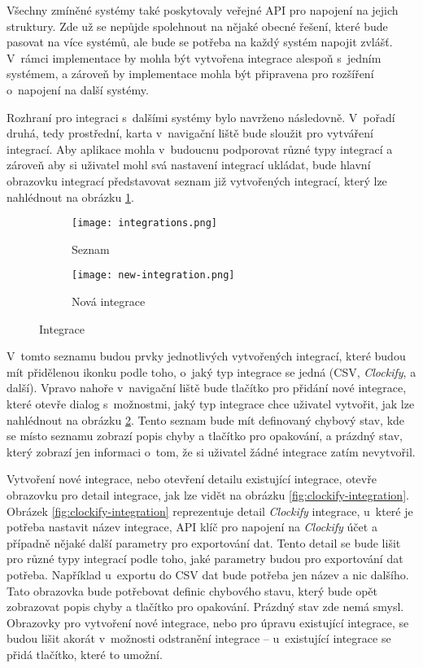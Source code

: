 Všechny zmíněné systémy také poskytovaly veřejné API pro napojení na jejich struktury. Zde už se nepůjde spolehnout na nějaké obecné řešení, které bude pasovat na více systémů, ale bude se potřeba na každý systém napojit zvlášť. V~rámci implementace by mohla být vytvořena integrace alespoň s~jedním systémem, a zároveň by implementace mohla být připravena pro rozšíření o~napojení na další systémy.

Rozhraní pro integraci s~dalšími systémy bylo navrženo následovně. V~pořadí druhá, tedy prostřední, karta v~navigační liště bude sloužit pro vytváření integrací. Aby aplikace mohla v~budoucnu podporovat různé typy integrací a zároveň aby si uživatel mohl svá nastavení integrací ukládat, bude hlavní obrazovku integrací představovat seznam již vytvořených integrací, který lze nahlédnout na obrázku \ref{fig:integration-list}.

\begin{figure}[h]
    \centering
    \begin{subfigure}[b]{0.4\textwidth}
		\centering
		\texttt{[image: integrations.png]}
		\caption{Seznam}
		\label{fig:integration-list}
	\end{subfigure}
	\hspace{2cm}
	\begin{subfigure}[b]{0.4\textwidth}
		\centering
		\texttt{[image: new-integration.png]}
		\caption{Nová integrace}
		\label{fig:new-integration}
	\end{subfigure}
	\caption{Integrace}
	\label{fig:integrations}
\end{figure}

V~tomto seznamu budou prvky jednotlivých vytvořených integrací, které budou mít přidělenou ikonku podle toho, o~jaký typ integrace se jedná (CSV, \emph{Clockify}, a další). Vpravo nahoře v~navigační liště bude tlačítko pro přidání nové integrace, které otevře dialog s~možnostmi, jaký typ integrace chce uživatel vytvořit, jak lze nahlédnout na obrázku \ref{fig:new-integration}. Tento seznam bude mít definovaný chybový stav, kde se místo seznamu zobrazí popis chyby a tlačítko pro opakování, a prázdný stav, který zobrazí jen informaci o~tom, že si uživatel žádné integrace zatím nevytvořil.

Vytvoření nové integrace, nebo otevření detailu existující integrace, otevře obrazovku pro detail integrace, jak lze vidět na obrázku \ref{fig:clockify-integration}. Obrázek \ref{fig:clockify-integration} reprezentuje detail \emph{Clockify} integrace, u~které je potřeba nastavit název integrace, API klíč pro napojení na \emph{Clockify} účet a případně nějaké další parametry pro exportování dat. Tento detail se bude lišit pro různé typy integrací podle toho, jaké parametry budou pro exportování dat potřeba. Například u~exportu do CSV dat bude potřeba jen název a nic dalšího. Tato obrazovka bude potřebovat definic chybového stavu, který bude opět zobrazovat popis chyby a tlačítko pro opakování. Prázdný stav zde nemá smysl. Obrazovky pro vytvoření nové integrace, nebo pro úpravu existující integrace, se budou lišit akorát v~možnosti odstranění integrace – u~existující integrace se přidá tlačítko, které to umožní.

